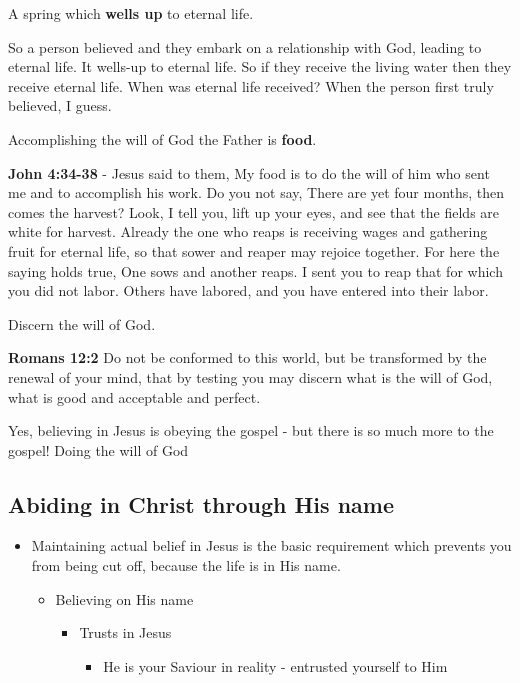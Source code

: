 \documentclass[11pt]{article}
\begin{document}
A spring which \textbf{wells up} to eternal life.

So a person believed and they embark on a relationship with God, leading to eternal life.
It wells-up to eternal life. So if they receive the living water then they receive eternal life.
When was eternal life received? When the person first truly believed, I guess.

Accomplishing the will of God the Father is \textbf{food}.

\textbf{John 4:34-38} - Jesus said to them, My food is to do the will of him who sent me and to accomplish his work. Do you not say, There are yet four months, then comes the harvest? Look, I tell you, lift up your eyes, and see that the fields are white for harvest. Already the one who reaps is receiving wages and gathering fruit for eternal life, so that sower and reaper may rejoice together. For here the saying holds true, One sows and another reaps. I sent you to reap that for which you did not labor. Others have labored, and you have entered into their labor.

Discern the will of God.

\textbf{Romans 12:2} Do not be conformed to this world, but be transformed by the renewal of your mind, that by testing you may discern what is the will of God, what is good and acceptable and perfect.

Yes, believing in Jesus is obeying the gospel - but there is so much more to the gospel! Doing the will of God

\subsection{Abiding in Christ through His name}
\label{sec:orgf3425ef}
\begin{itemize}
\item Maintaining actual belief in Jesus is the basic requirement which prevents you from being cut off, because the life is in His name.
\begin{itemize}
\item Believing on His name
\begin{itemize}
\item Trusts in Jesus
\begin{itemize}
\item He is your Saviour in reality - entrusted yourself to Him
\end{itemize}
\end{itemize}
\end{itemize}
\end{itemize}
\end{document}
